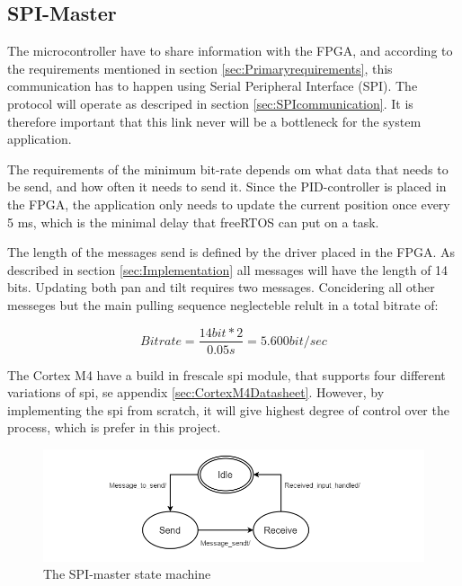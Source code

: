 \subsection{SPI-Master}
\label{sec:SPIMaster}

The microcontroller have to share information with the FPGA, and according to the requirements mentioned in section \ref{sec:Primaryrequirements}, this communication has to happen using Serial Peripheral Interface (SPI). The protocol will operate as descriped in section \ref{sec:SPIcommunication}. It is therefore important that this link never will be a bottleneck for the system application. 

The requirements of the minimum bit-rate depends om what data that needs to be send, and how often it needs to send it. Since the PID-controller is placed in the FPGA, the application only needs to update the current position once every 5 ms, which is the minimal delay that freeRTOS can put on a task. 

The length of the messages send is defined by the driver placed in the FPGA. As described in section \ref{sec:Implementation} all messages will have the length of 14 bits. Updating both pan and tilt requires two messages. Concidering all other messeges but the main pulling sequence neglecteble relult in a total bitrate of:

\begin{equation}
Bitrate = \frac{
14 bit * 2	
}{
0.05s
} = 5.600 bit/sec 
\end{equation}

The Cortex M4 have a build in frescale spi module, that supports four different variations of spi, se appendix \ref{sec:CortexM4Datasheet}. However, by implementing the spi from scratch, it will give highest degree of control over the process, which is prefer in this project. 

\begin{figure}
	\centering
	\includegraphics[scale = 0.7] {Billeder/SPI-master}
	\caption{The SPI-master state machine}
	\label{fig:SPI-master}
\end{figure}

